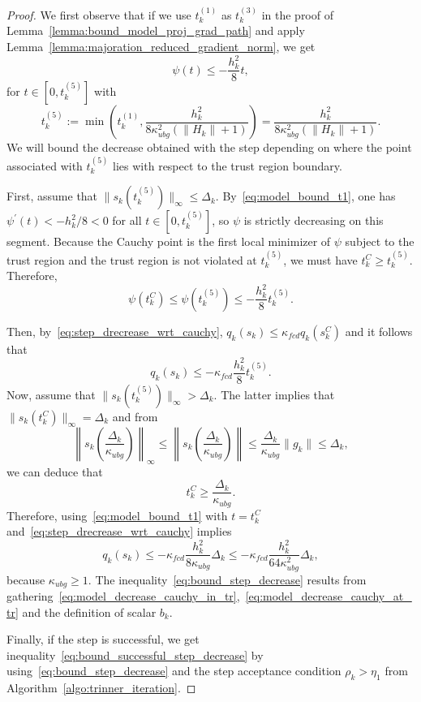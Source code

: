 \documentclass{article}
\numberwithin{equation}{section}
\theoremstyle{plain}
\begin{document}
	\begin{proof}
		We first observe that if we use $t_k^{(1)}$ as $t_k^{(3)}$ in the proof of Lemma~\ref{lemma:bound_model_proj_grad_path} and apply Lemma~\ref{lemma:majoration_reduced_gradient_norm}, we get 
		\begin{equation}\label{eq:model_bound_t1}
			\psi(t) \le -\dfrac{h_k^2}{8} t,
		\end{equation}
		for $t \in [0,t_k^{(5)}]$ with \[t_k^{(5)} := \min\left(t_k^{(1)},\dfrac{h_k^2}{8\kappa_{ubg}^2 (\|H_k\|+1)}\right) = \dfrac{h_k^2}{8\kappa_{ubg}^2 (\|H_k\|+1)}.\]
		We will bound the decrease obtained with the step depending on where the point associated with $t_k^{(5)}$ lies with respect to the trust region boundary.
		
		First, assume that $\|s_k(t_k^{(5)})\|_\infty \le \Delta_k$. By~\eqref{eq:model_bound_t1}, one has $\psi^\prime(t) < -h_k^2 /8 < 0$ for all $t \in  [0,t_k^{(5)}]$, so $\psi$ is strictly decreasing on this segment. Because the Cauchy point is the first local minimizer of $\psi$ subject to the trust region and the trust region is not violated at $t_k^{(5)}$, we must have $t_k^C \ge t_k^{(5)}$. Therefore, 
		\[\psi(t_k^C) \le \psi(t_k^{(5)}) \le -\dfrac{h_k^2}{8} t_k^{(5)}. \]
		
		Then, by~\eqref{eq:step_drecrease_wrt_cauchy}, $q_k(s_k) \le \kappa_{fcd} q_k(s_k^C)$ and it follows that
		\begin{equation}\label{eq:model_decrease_cauchy_in_tr}
			q_k(s_k) \le -\kappa_{fcd} \frac{h_k^2}{8} t_k^{(5)}.
		\end{equation}
		Now, assume that $\|s_k(t_k^{(5)})\|_\infty > \Delta_k$. The latter implies that $\|s_k(t_k^C)\|_\infty = \Delta_k$ and from
		\begin{equation*}
			\left\|s_k\left(\frac{\Delta_k}{\kappa_{ubg}}\right)\right\|_\infty \le 	\left\|s_k\left(\frac{\Delta_k}{\kappa_{ubg}}\right)\right\| \le \frac{\Delta_k}{\kappa_{ubg}} \|g_k\| \le \Delta_k,
		\end{equation*}
		we can deduce that 
		\begin{equation*}
			t_k^C \ge \frac{\Delta_k}{\kappa_{ubg}}.
		\end{equation*}
		Therefore, using~\eqref{eq:model_bound_t1} with $t=t_k^C$ and~\eqref{eq:step_drecrease_wrt_cauchy} implies
		\begin{equation}\label{eq:model_decrease_cauchy_at_tr}
			q_k(s_k) \le -\kappa_{fcd} \frac{h_k^2}{8\kappa_{ubg}} \Delta_k \le -\kappa_{fcd} \frac{h_k^2}{64\kappa_{ubg}^2} \Delta_k,
		\end{equation} 
		because $\kappa_{ubg} \ge 1.$
		The inequality~\eqref{eq:bound_step_decrease} results from gathering~\eqref{eq:model_decrease_cauchy_in_tr},~\eqref{eq:model_decrease_cauchy_at_tr} and the definition of scalar $b_k$. 
		
		Finally, if the step is successful, we get inequality~\eqref{eq:bound_successful_step_decrease} by using~\eqref{eq:bound_step_decrease} and the step acceptance condition $\rho_k > \eta_1$ from Algorithm~\ref{algo:trinner_iteration}. 
	\end{proof}
	
\end{document}
